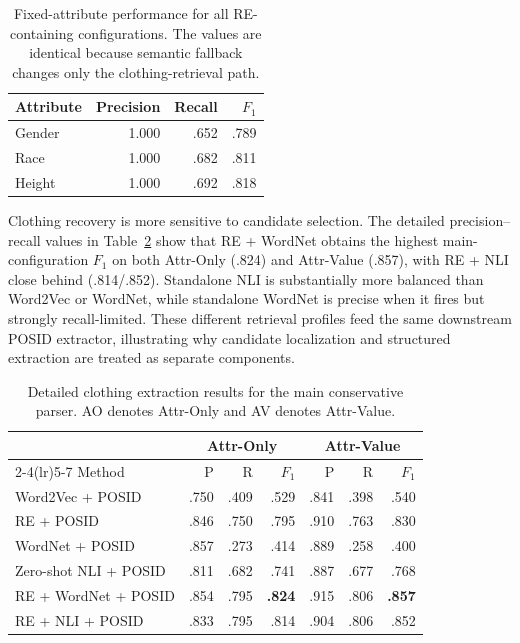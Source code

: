 \documentclass[sigconf,nonacm]{acmart}
\newcommand{\posid}{\textsc{POSID}}
\begin{document}
\begin{table}[t]
    \centering
    \caption{Fixed-attribute performance for all RE-containing configurations.
    The values are identical because semantic fallback changes only the
    clothing-retrieval path.}
    \label{tab:fixed-detail}
    \small
    \begin{tabular}{lrrr}
        \toprule
        Attribute & Precision & Recall & $F_1$ \\
        \midrule
        Gender & 1.000 & .652 & .789 \\
        Race & 1.000 & .682 & .811 \\
        Height & 1.000 & .692 & .818 \\
        \bottomrule
    \end{tabular}
\end{table}

Clothing recovery is more sensitive to candidate selection.  The detailed
precision--recall values in Table~\ref{tab:clothing-detail} show that RE +
WordNet obtains the highest main-configuration $F_1$ on both Attr-Only (.824)
and Attr-Value (.857), with RE + NLI close behind (.814/.852).  Standalone NLI
is substantially more balanced than Word2Vec or WordNet, while standalone
WordNet is precise when it fires but strongly recall-limited.  These different
retrieval profiles feed the same downstream POSID extractor, illustrating why
candidate localization and structured extraction are treated as separate
components.

\begin{table}[t]
    \centering
    \caption{Detailed clothing extraction results for the main conservative
    parser.  AO denotes Attr-Only and AV denotes Attr-Value.}
    \label{tab:clothing-detail}
    \small
    \setlength{\tabcolsep}{6pt}
    \begin{tabular}{lrrrrrr}
        \toprule
        & \multicolumn{3}{c}{Attr-Only} & \multicolumn{3}{c}{Attr-Value} \\
        \cmidrule(lr){2-4}\cmidrule(lr){5-7}
        Method & P & R & $F_1$ & P & R & $F_1$ \\
        \midrule
        Word2Vec + \posid{} & .750 & .409 & .529 & .841 & .398 & .540 \\
        RE + \posid{} & .846 & .750 & .795 & .910 & .763 & .830 \\
        WordNet + \posid{} & .857 & .273 & .414 & .889 & .258 & .400 \\
        Zero-shot NLI + \posid{} & .811 & .682 & .741 & .887 & .677 & .768 \\
        RE + WordNet + \posid{} & .854 & .795 & \textbf{.824} & .915 & .806 & \textbf{.857} \\
        RE + NLI + \posid{} & .833 & .795 & .814 & .904 & .806 & .852 \\
        \bottomrule
    \end{tabular}
\end{table}
\end{document}
